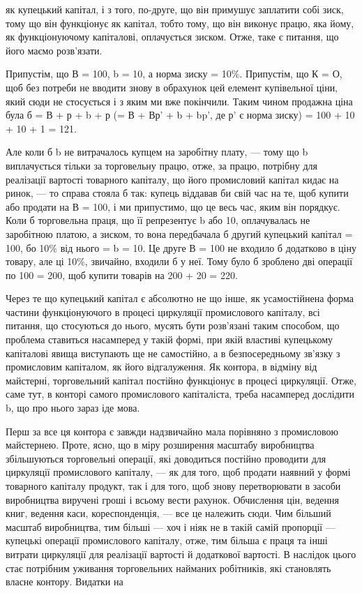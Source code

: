як купецький капітал, і з того, по-друге, що він примушує заплатити
собі зиск, тому що він функціонує як капітал, тобто
тому, що він виконує працю, яка йому, як функціонуючому капіталові,
оплачується зиском. Отже, таке є питання, що його маємо
розв’язати.

Припустім, що В = 100, b = 10, а норма зиску = 10\%. Припустім,
що К = О, щоб без потреби не вводити знову в обрахунок
цей елемент купівельної ціни, який сюди не стосується і з
яким ми вже покінчили. Таким чином продажна ціна була б =
В + р + b + р (= В + Вр' + b + bp', де р' є норма зиску) =
100 + 10 + 10 + 1 = 121.

Але коли б b не витрачалось купцем на заробітну плату, —
тому що b виплачується тільки за торговельну працю, отже, за
працю, потрібну для реалізації вартості товарного капіталу, що
його промисловий капітал кидає на ринок, — то справа стояла б
так: купець віддавав би свій час на те, щоб купити або продати
на В = 100, і ми припустимо, що це весь час, яким він порядкує.
Коли б торговельна праця, що її репрезентує b або 10,
оплачувалась не заробітною платою, а зиском, то вона передбачала
б другий купецький капітал = 100, бо 10\% від нього =
b = 10. Це друге В = 100 не входило б додатково в ціну товару,
але ці 10\%, звичайно, входили б у неї. Тому було б зроблено дві
операції по 100 = 200, щоб купити товарів на 200 + 20 = 220.

Через те що купецький капітал є абсолютно не що інше, як
усамостійнена форма частини функціонуючого в процесі циркуляції
промислового капіталу, всі питання, що стосуються до нього,
мусять бути розв’язані таким способом, що проблема ставиться
насамперед у такій формі, при якій властиві купецькому капіталові
явища виступають ще не самостійно, а в безпосередньому
зв’язку з промисловим капіталом, як його відгалуження. Як контора,
в відміну від майстерні, торговельний капітал постійно
функціонує в процесі циркуляції. Отже, саме тут, в конторі
самого промислового капіталіста, треба насамперед дослідити b,
що про нього зараз іде мова.

Перш за все ця контора є завжди надзвичайно мала порівняно
з промисловою майстернею. Проте, ясно, що в міру розширення
масштабу виробництва збільшуються торговельні операції,
які доводиться постійно проводити для циркуляції промислового
капіталу, — як для того, щоб продати наявний у формі
товарного капіталу продукт, так і для того, щоб знову перетворювати
в засоби виробництва виручені гроші і всьому вести рахунок.
Обчислення цін, ведення книг, ведення каси, кореспонденція,
— все це належить сюди. Чим більший масштаб виробництва,
тим більші — хоч і ніяк не в такій самій пропорції — купецькі операції
промислового капіталу, отже, тим більша є праця та інші
витрати циркуляції для реалізації вартості й додаткової вартості.
В наслідок цього стає потрібним уживання торговельних
найманих робітників, які становлять власне контору. Видатки на
